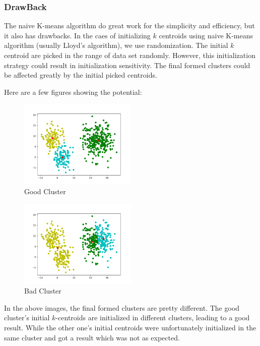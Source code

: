 \documentclass[11pt]{article}
\begin{document}
  \subsubsection{DrawBack}
  The naive K-means algorithm do great work for the simplicity and efficiency, but it also has drawbacks. In the caes of initializing $k$ centroids using naive K-means algorithm (usually Lloyd's algorithm), we use randomization.
  The initial $k$ centroid are picked in the range of data set randomly. However, this initialization strategy could result in initialization sensitivity. The final formed clusters could be affected greatly by the initial picked centroids.
  \par Here are a few figures showing the potential:
\begin{figure}[H] %
  \centering %
  \includegraphics[width=0.5\textwidth]{goodCluster.png} %
  \caption{Good Cluster} %
  \label{Fig.GoodCluster} %
\end{figure}
\begin{figure}[H] %
  \centering %
  \includegraphics[width=0.5\textwidth]{badCluster.png} %
  \caption{Bad Cluster} %
  \label{Fig.BadCluster} %
\end{figure}
\par In the above images, the final formed clusters are pretty different. The good cluster's\cite{Fig.GoodCluster} initial $k$-centroids are initialized in different clusters, leading to a good result. While the other one's\cite{Fig.BadCluster} initial centroids were unfortunately initialized in the same cluster and got a result which was not as expected.
\end{document}
